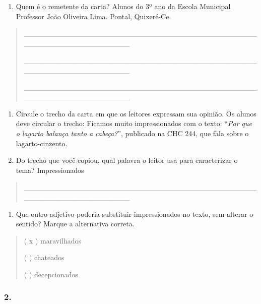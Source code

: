 \begin{enumerate}
\def\labelenumi{\alph{enumi})}
\item
  Quem é o remetente da carta? Alunos do 3º ano da Escola Municipal
  Professor João Oliveira Lima. Pontal, Quixeré-Ce.
\end{enumerate}

\begin{quote}
\_\_\_\_\_\_\_\_\_\_\_\_\_\_\_\_\_\_\_\_\_\_\_\_\_\_\_\_\_\_\_\_\_\_\_\_\_\_\_\_\_\_\_\_\_\_\_\_\_\_\_\_\_\_\_\_\_\_\_\_\_\_\_\_

\_\_\_\_\_\_\_\_\_\_\_\_\_\_\_\_\_\_\_\_\_\_\_\_\_\_\_\_\_\_\_\_\_\_\_\_\_\_\_\_\_\_\_\_\_\_\_\_\_\_\_\_\_\_\_\_\_\_\_\_\_\_\_\_

\_\_\_\_\_\_\_\_\_\_\_\_\_\_\_\_\_\_\_\_\_\_\_\_\_\_\_\_\_\_\_\_\_\_\_\_\_\_\_\_\_\_\_\_\_\_\_\_\_\_\_\_\_\_\_\_\_\_\_\_\_\_\_\_
\end{quote}

\begin{enumerate}
\def\labelenumi{\alph{enumi})}
\item
  Circule o trecho da carta em que os leitores expressam sua opinião. Os
  alunos deve circular o trecho: Ficamos muito impressionados com o
  texto: ``\emph{Por que o lagarto balança tanto a cabeça?}'', publicado
  na CHC 244, que fala sobre o lagarto-cinzento.
\item
  Do trecho que você copiou, qual palavra o leitor usa para caracterizar
  o tema? Impressionados
\end{enumerate}

\begin{quote}
\_\_\_\_\_\_\_\_\_\_\_\_\_\_\_\_\_\_\_\_\_\_\_\_\_\_\_\_\_\_\_\_\_\_\_\_\_\_\_\_\_\_\_\_\_\_\_\_\_\_\_\_\_\_\_\_\_\_\_\_\_\_\_\_
\end{quote}

\begin{enumerate}
\def\labelenumi{\alph{enumi})}
\item
  Que outro adjetivo poderia substituir impressionados no texto, sem
  alterar o sentido? Marque a alternativa correta.
\end{enumerate}

\begin{quote}
( x ) maravilhados

( ) chateados

( ) decepcionados
\end{quote}

\subsubsection{2. }\label{section-58}

